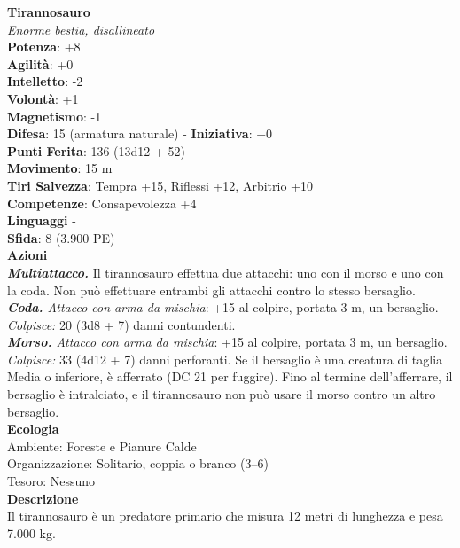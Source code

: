 \begin{multicols}{2}
\medskip\textbf{Tirannosauro}\\
\emph{Enorme bestia, disallineato}\\
\textbf{Potenza}: +8\\
\textbf{Agilità}: +0\\
\textbf{Intelletto}: -2\\
\textbf{Volontà}: +1\\
\textbf{Magnetismo}: -1\\
\textbf{Difesa}: 15 (armatura naturale) - \textbf{Iniziativa}: +0\\
\textbf{Punti Ferita}: 136 (13d12 + 52)\\
\textbf{Movimento}: 15 m\\
\textbf{Tiri Salvezza}: Tempra +15, Riflessi +12, Arbitrio +10\\
\textbf{Competenze}: Consapevolezza +4\\
\textbf{Linguaggi} -\\
\textbf{Sfida}: 8 (3.900 PE)\smallskip\\
\smallskip\textbf{Azioni}\\
\emph{\textbf{Multiattacco.}} Il tirannosauro effettua due attacchi: uno con il morso e uno con la coda. Non può effettuare entrambi gli attacchi contro lo stesso bersaglio. \\
\emph{\textbf{Coda.} Attacco con arma da mischia}: +15 al colpire, portata 3 m, un bersaglio.\\
\emph{Colpisce:} 20 (3d8 + 7) danni contundenti.\\
\emph{\textbf{Morso.} Attacco con arma da mischia}: +15 al colpire, portata 3 m, un bersaglio.\\
\emph{Colpisce:} 33 (4d12 + 7) danni perforanti. Se il bersaglio è una creatura di taglia Media o inferiore, è afferrato (DC  21 per fuggire). Fino al termine dell'afferrare, il bersaglio è intralciato, e il tirannosauro non può usare il morso contro un altro bersaglio.\\
\textbf{Ecologia}\\
Ambiente: Foreste e Pianure Calde\\
Organizzazione: Solitario, coppia o branco (3–6)\\
Tesoro: Nessuno\\
\textbf{Descrizione}\\
Il tirannosauro è un predatore primario che misura 12 metri di lunghezza e pesa 7.000 kg.\\


\end{multicols}
